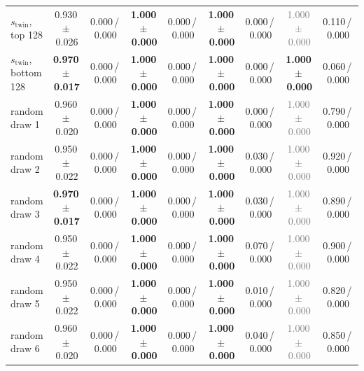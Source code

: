 \begin{tabular}{@{}lcccccccc@{}}
$s_{\text{twin}}$, top 128 & 0.930\,{\scriptsize$\pm$\,0.026} & {\scriptsize 0.000\,/\,0.000} & \textbf{1.000\,{\scriptsize$\pm$\,0.000}} & {\scriptsize 0.000\,/\,0.000} & \textbf{1.000\,{\scriptsize$\pm$\,0.000}} & {\scriptsize 0.000\,/\,0.000} & \textcolor{gray}{1.000\,{\scriptsize$\pm$\,0.000}} & {\scriptsize 0.110\,/\,0.000} \\
$s_{\text{twin}}$, bottom 128 & \textbf{0.970\,{\scriptsize$\pm$\,0.017}} & {\scriptsize 0.000\,/\,0.000} & \textbf{1.000\,{\scriptsize$\pm$\,0.000}} & {\scriptsize 0.000\,/\,0.000} & \textbf{1.000\,{\scriptsize$\pm$\,0.000}} & {\scriptsize 0.000\,/\,0.000} & \textbf{1.000\,{\scriptsize$\pm$\,0.000}} & {\scriptsize 0.060\,/\,0.000} \\
\midrule
random draw 1 & 0.960\,{\scriptsize$\pm$\,0.020} & {\scriptsize 0.000\,/\,0.000} & \textbf{1.000\,{\scriptsize$\pm$\,0.000}} & {\scriptsize 0.000\,/\,0.000} & \textbf{1.000\,{\scriptsize$\pm$\,0.000}} & {\scriptsize 0.000\,/\,0.000} & \textcolor{gray}{1.000\,{\scriptsize$\pm$\,0.000}} & {\scriptsize 0.790\,/\,0.000} \\
random draw 2 & 0.950\,{\scriptsize$\pm$\,0.022} & {\scriptsize 0.000\,/\,0.000} & \textbf{1.000\,{\scriptsize$\pm$\,0.000}} & {\scriptsize 0.000\,/\,0.000} & \textbf{1.000\,{\scriptsize$\pm$\,0.000}} & {\scriptsize 0.030\,/\,0.000} & \textcolor{gray}{1.000\,{\scriptsize$\pm$\,0.000}} & {\scriptsize 0.920\,/\,0.000} \\
random draw 3 & \textbf{0.970\,{\scriptsize$\pm$\,0.017}} & {\scriptsize 0.000\,/\,0.000} & \textbf{1.000\,{\scriptsize$\pm$\,0.000}} & {\scriptsize 0.000\,/\,0.000} & \textbf{1.000\,{\scriptsize$\pm$\,0.000}} & {\scriptsize 0.030\,/\,0.000} & \textcolor{gray}{1.000\,{\scriptsize$\pm$\,0.000}} & {\scriptsize 0.890\,/\,0.000} \\
random draw 4 & 0.950\,{\scriptsize$\pm$\,0.022} & {\scriptsize 0.000\,/\,0.000} & \textbf{1.000\,{\scriptsize$\pm$\,0.000}} & {\scriptsize 0.000\,/\,0.000} & \textbf{1.000\,{\scriptsize$\pm$\,0.000}} & {\scriptsize 0.070\,/\,0.000} & \textcolor{gray}{1.000\,{\scriptsize$\pm$\,0.000}} & {\scriptsize 0.900\,/\,0.000} \\
\midrule
random draw 5 & 0.950\,{\scriptsize$\pm$\,0.022} & {\scriptsize 0.000\,/\,0.000} & \textbf{1.000\,{\scriptsize$\pm$\,0.000}} & {\scriptsize 0.000\,/\,0.000} & \textbf{1.000\,{\scriptsize$\pm$\,0.000}} & {\scriptsize 0.010\,/\,0.000} & \textcolor{gray}{1.000\,{\scriptsize$\pm$\,0.000}} & {\scriptsize 0.820\,/\,0.000} \\
random draw 6 & 0.960\,{\scriptsize$\pm$\,0.020} & {\scriptsize 0.000\,/\,0.000} & \textbf{1.000\,{\scriptsize$\pm$\,0.000}} & {\scriptsize 0.000\,/\,0.000} & \textbf{1.000\,{\scriptsize$\pm$\,0.000}} & {\scriptsize 0.040\,/\,0.000} & \textcolor{gray}{1.000\,{\scriptsize$\pm$\,0.000}} & {\scriptsize 0.850\,/\,0.000} \\

\end{tabular}
